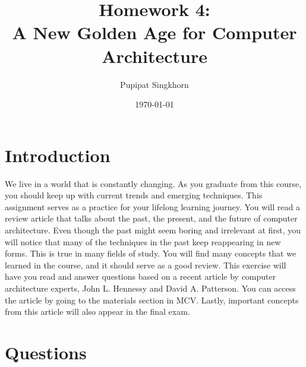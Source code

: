 \documentclass[a4paper,12pt]{article}
\title{Homework 4:\\A New Golden Age for Computer Architecture}
\author{Pupipat Singkhorn}
\date{\today}
\begin{document}
\maketitle

\section*{Introduction}

We live in a world that is constantly changing. As you graduate from this course, you should keep up with current trends and emerging techniques. This assignment serves as a practice for your lifelong learning journey. You will read a review article that talks about the past, the present, and the future of computer architecture. Even though the past might seem boring and irrelevant at first, you will notice that many of the techniques in the past keep reappearing in new forms. This is true in many fields of study.
You will find many concepts that we learned in the course, and it should serve as a good review.
This exercise will have you read and answer questions based on a recent article by computer architecture experts, John L. Hennessy and David A. Patterson.
You can access the article by going to the materials section in MCV.
Lastly, important concepts from this article will also appear in the final exam.

\section*{Questions}
\end{document}
